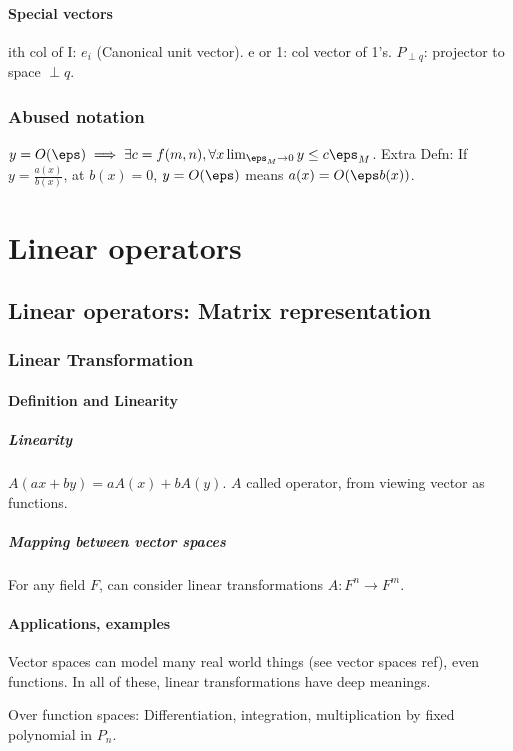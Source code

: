 \documentclass[oneside, article]{memoir}
\begin{document}
\subsection{Special vectors}
ith col of I: $e_{i}$ (Canonical unit vector). e or 1: col vector of 1's. $P_{\perp q}$: projector to space $\perp q$.

\section{Abused notation}
$y = O(\eps) \implies  \exists c = f(m,n), \forall x \lim_{\eps_{M} \to 0} y \leq c\eps_{M}$. Extra Defn: If $y = \frac{a(x)}{b(x)}$, at $b(x) = 0$, $y = O(\eps)$ means $a(x) = O(\eps b(x))$.


\part{Linear operators}
\chapter{Linear operators: Matrix representation}
\section{Linear Transformation}
\subsection{Definition and Linearity}
\subsubsection{Linearity}
$A(ax+by) = aA(x)+bA(y)$. $A$ called operator, from viewing vector as functions.

\subsubsection{Mapping between vector spaces}
For any field $F$, can consider linear transformations $A: F^{n} \to F^{m}$.

\subsection{Applications, examples}
Vector spaces can model many real world things (see vector spaces ref), even functions. In all of these, linear transformations have deep meanings.

Over function spaces: Differentiation, integration, multiplication by fixed polynomial in $P_n$.
\end{document}
